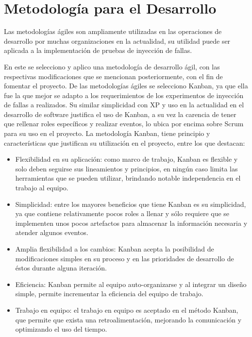 \section{Metodología para el Desarrollo}


\par Las metodologías ágiles son ampliamente utilizadas en las operaciones de desarrollo por muchas organizaciones en la actualidad, su utilidad puede ser aplicada a la implementación de pruebas de inyección de fallas.\\ %
\par En este se selecciono y aplico una metodología de desarrollo ágil, con las respectivas modificaciones que se mencionan posteriormente, con el fin de fomentar el proyecto. De las metodologías ágiles se selecciono Kanban, ya que ella fue la que mejor se adapto a los requerimientos de los experimentos de inyección de fallas a realizados. Su similar simplicidad con XP y uso en la actualidad en el desarrollo de software justifica el uso de Kanban, a su vez la carencia de tener que rellenar roles específicos y realizar eventos, lo ubica por encima sobre Scrum para su uso en el proyecto. La metodología Kanban, tiene principio y características  que justifican su utilización en el proyecto, entre los que destacan:
\begin{itemize}
    \item Flexibilidad en su aplicación: como marco de trabajo, Kanban es flexible y solo deben seguirse sus lineamientos y principios, en ningún caso limita las herramientas que se pueden utilizar, brindando notable independencia en el trabajo al equipo.
    \item Simplicidad: entre los mayores beneficios que tiene Kanban es su simplicidad, ya que contiene relativamente pocos roles a llenar y sólo requiere que se implementen unos pocos artefactos para almacenar la información necesaria y atender algunos eventos.
    \item Amplia flexibilidad a los cambios: Kanban acepta la posibilidad de modificaciones simples en su proceso y en las prioridades de desarrollo de éstos durante alguna iteración.
    \item Eficiencia: Kanban permite al equipo auto-organizarse y al integrar un diseño simple, permite incrementar la eficiencia del equipo de trabajo.
    \item Trabajo en equipo: el trabajo en equipo es aceptado en el método Kanban, que permite que exista una retroalimentación, mejorando la comunicación y optimizando el uso del tiempo.
\end{itemize} 
